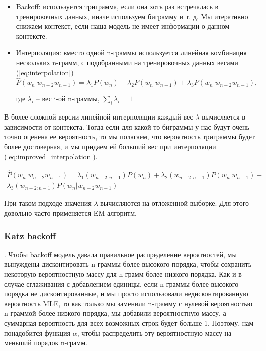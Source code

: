 \begin{itemize}
	\item Backoff: используется триграмма, если она хоть раз встречалась в тренировочных данных, иначе используем биграмму и т. д. Мы итеративно снижаем контекст, если наша модель не имеет информации о данном контексте.
	\item Интерполяция: вместо одной n-граммы используется линейная комбинация нескольких n-грамм, с подобранными на тренировочных данных весами (\ref{eq:interpolation})
	\begin{equation}
		\hat{P}(w_n|w_{n-2}w_{n-1}) = \lambda_1 P(w_n) + \lambda_2 P(w_n|w_{n-1}) + \lambda_3 P(w_n|w_{n-2}w_{n-1})
		\label{eq:interpolation},
	\end{equation}
	\begin{explanation}
		где $\lambda_i$ -- вес i-ой n-граммы, $\sum_{i}{\lambda_i} = 1$
	\end{explanation}
\end{itemize}

В более сложной версии линейной интерполяции каждый вес $\lambda$ вычисляется в зависимости от контекста. Тогда если для какой-то биграммы у нас будут очень точно оценена ее вероятность, то мы полагаем, что вероятность триграммы будет более достоверная, и мы придаем ей больший вес при интерполяции (\ref{eq:improved_interpolation}).

\begin{equation}
	\begin{split}
	\hat{P}(w_n|w_{n-2}w_{n-1}) = \lambda_1(w_{n-2:n-1}) P(w_n) + \lambda_2(w_{n-2:n-1}) P(w_n|w_{n-1}) + \\ \lambda_3(w_{n-2:n-1}) P(w_n|w_{n-2}w_{n-1})
	\end{split}
	\label{eq:improved_interpolation}
\end{equation}

При таком подходе значения $\lambda$ вычисляются на отложенной выборке. Для этого довольно часто применяется EM алгоритм.

\subsubsection{Katz backoff}. Чтобы backoff модель давала правильное распределение вероятностей, мы вынуждены дисконтировать n-граммы более высокого порядка, чтобы сохранить некоторую вероятностную массу для n-грамм более низкого порядка. Как и в случае сглаживания с добавлением единицы, если n-граммы более высокого порядка не дисконтированные, и мы просто использовали недисконтированную вероятность MLE, то как только мы
заменили n-грамму с нулевой вероятностью n-граммой более низкого порядка, мы добавили вероятностную массу, а суммарная вероятность для всех возможных строк будет больше 1. Поэтому, нам понадобится функция $\alpha$, чтобы распределить эту вероятностную массу на меньший порядок n-грамм. ~\cite{n_grams}

